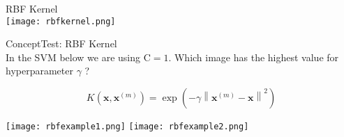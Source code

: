 \begin{example2}{RBF Kernel}\\
    \texttt{[image: rbfkernel.png]}
\end{example2}



\begin{example2}{ConceptTest: RBF Kernel}\\
    In the SVM below we are using $\mathrm{C}=1$. Which image has the highest value for hyperparameter $\gamma$ ?

    \[ K\left(\mathbf{x}, \mathbf{x}^{(m)}\right)=\exp \left(-\gamma\left\|\mathbf{x}^{(m)}-\mathbf{x}\right\|^2\right) \]

    \texttt{[image: rbfexample1.png]}
    \texttt{[image: rbfexample2.png]}
\end{example2}



